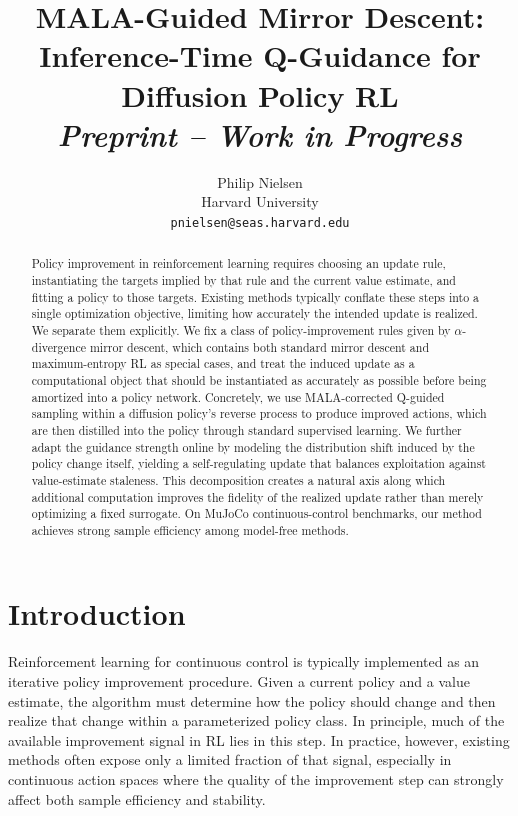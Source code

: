 \documentclass{article}
\title{MALA-Guided Mirror Descent:\\Inference-Time Q-Guidance for Diffusion Policy RL\\[0.5em]\normalsize\textit{Preprint -- Work in Progress}}
\author{%
  Philip Nielsen \\
  Harvard University\\
  \texttt{pnielsen@seas.harvard.edu} \\
}
\theoremstyle{plain}
\theoremstyle{definition}
\theoremstyle{remark}
\begin{document}
\maketitle

\begin{abstract}
Policy improvement in reinforcement learning requires choosing an update rule, instantiating the targets implied by that rule and the current value estimate, and fitting a policy to those targets. Existing methods typically conflate these steps into a single optimization objective, limiting how accurately the intended update is realized. We separate them explicitly. We fix a class of policy-improvement rules given by $\alpha$-divergence mirror descent, which contains both standard mirror descent and maximum-entropy RL as special cases, and treat the induced update as a computational object that should be instantiated as accurately as possible before being amortized into a policy network. Concretely, we use MALA-corrected Q-guided sampling within a diffusion policy's reverse process to produce improved actions, which are then distilled into the policy through standard supervised learning. We further adapt the guidance strength online by modeling the distribution shift induced by the policy change itself, yielding a self-regulating update that balances exploitation against value-estimate staleness. This decomposition creates a natural axis along which additional computation improves the fidelity of the realized update rather than merely optimizing a fixed surrogate. On MuJoCo continuous-control benchmarks, our method achieves strong sample efficiency among model-free methods.
\end{abstract}

\section{Introduction}
\label{sec:intro}

Reinforcement learning for continuous control is typically implemented as an iterative policy improvement procedure. Given a current policy and a value estimate, the algorithm must determine how the policy should change and then realize that change within a parameterized policy class. In principle, much of the available improvement signal in RL lies in this step. In practice, however, existing methods often expose only a limited fraction of that signal, especially in continuous action spaces where the quality of the improvement step can strongly affect both sample efficiency and stability.
\end{document}
